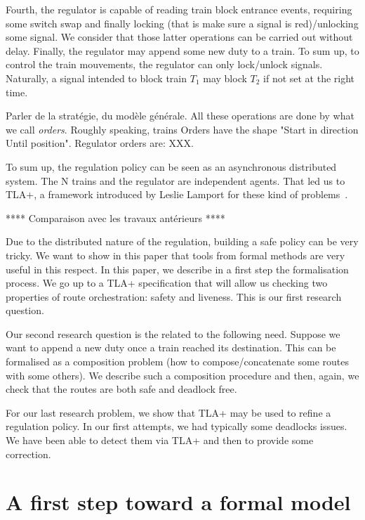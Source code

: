 \documentclass[runningheads]{llncs}
\begin{document}
Fourth,  the regulator is capable of reading train block entrance events, requiring some switch swap and finally locking (that is make sure a signal is red)/unlocking some signal. We consider that those latter operations can be carried out without delay. Finally, the regulator may append some new duty to a train. To sum up, to control the train mouvements, the regulator can only lock/unlock signals. Naturally, a signal intended to block train $T_1$ may block $T_2$ if not set at the right time.   
 
 Parler de la stratégie, du modèle générale. All these operations are done by what we call  \emph{orders}. Roughly speaking, trains Orders have the shape "Start in direction Until position". Regulator orders are: XXX. 
 
 
 To sum up, the regulation policy can be seen as an asynchronous distributed system. The N trains and the regulator are independent agents. That led us to TLA+, a framework introduced by Leslie Lamport for these kind of problems~\cite{Lamport}.  
 
 
 **** Comparaison avec les travaux antérieurs ****
 
 
Due to the distributed nature of the regulation, building a safe policy can be very tricky. We want to show in this paper that tools from formal methods are very useful in this respect.  In this paper, we describe in  a first step the formalisation process. We go up to a TLA+ specification that will allow us checking two properties of route orchestration: safety and liveness. This is our first research question. 

Our second research question is the related to the following need. Suppose we want to append a new duty once a train reached its destination. This can be formalised as a composition problem (how to compose/concatenate some routes with some others). We describe such a composition procedure and then, again, we check that the routes are both safe and deadlock free. 

For our last research problem, we show that TLA+ may be used to refine a regulation policy. In our first attempts, we had typically some deadlocks issues. We have been able to detect them via TLA+ and then to provide some correction. 




\section{A first step toward a formal model}
\label{sec:informal-model}
\end{document}

